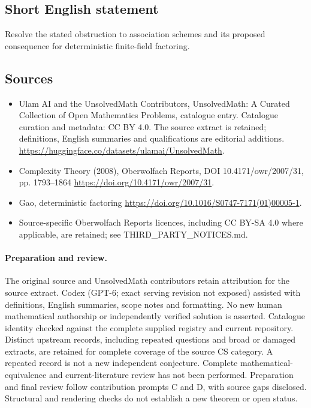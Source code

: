 \documentclass[11pt]{article}
\begin{document}
\subsection{Short English statement}
Resolve the stated obstruction to association schemes and its proposed consequence for deterministic finite-field factoring.
\subsection{Sources}
\begin{itemize}
\item[\hypertarget{source:statement:1}{S1}] Ulam AI and the UnsolvedMath Contributors, UnsolvedMath: A Curated Collection of Open Mathematics Problems, catalogue entry. Catalogue curation and metadata: CC BY 4.0. The source extract is retained; definitions, English summaries and qualifications are editorial additions.
\url{https://huggingface.co/datasets/ulamai/UnsolvedMath}.
\item[\hypertarget{source:statement:2}{S2}] Complexity Theory (2008), Oberwolfach Reports, DOI 10.4171/owr/2007/31, pp. 1793--1864
\url{https://doi.org/10.4171/owr/2007/31}.
\item[\hypertarget{source:statement:3}{S3}] Gao, deterministic factoring
\url{https://doi.org/10.1016/S0747-7171(01)00005-1}.
\item Source-specific Oberwolfach Reports licences, including CC BY-SA 4.0 where applicable, are retained; see THIRD\_PARTY\_NOTICES.md.
\end{itemize}
\paragraph{Preparation and review.}
The original source and UnsolvedMath contributors retain attribution for the source extract. Codex (GPT-6; exact serving revision not exposed) assisted with definitions, English summaries, scope notes and formatting. No new human mathematical authorship or independently verified solution is asserted. Catalogue identity checked against the complete supplied registry and current repository. Distinct upstream records, including repeated questions and broad or damaged extracts, are retained for complete coverage of the source CS category. A repeated record is not a new independent conjecture. Complete mathematical-equivalence and current-literature review has not been performed. Preparation and final review follow contribution prompts C and D, with source gaps disclosed. Structural and rendering checks do not establish a new theorem or open status.
\label{end:statement}
\end{document}

